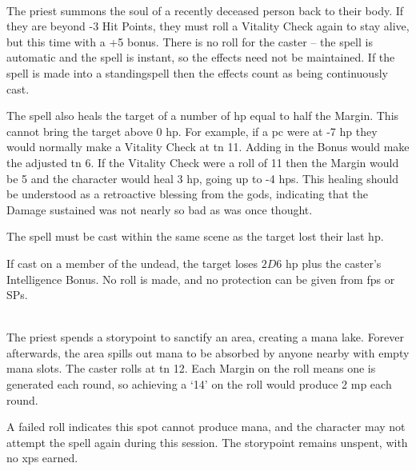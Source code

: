 \begin{multicols}{2}
\\
The priest summons the soul of a recently deceased person back to their body.
If they are beyond -3 Hit Points, they must roll a Vitality Check again to stay alive, but this time with a +5 bonus.
There is no roll for the caster -- the spell is automatic and the spell is instant, so the effects need not be maintained.
If the spell is made into a \gls{standingspell} then the effects count as being continuously cast.

The spell also heals the target of a number of \gls{hp} equal to half the Margin.
This cannot bring the target above 0 \gls{hp}.
For example, if a \gls{pc} were at -7 \gls{hp} they would normally make a Vitality Check at \gls{tn} 11.
Adding in the Bonus would make the adjusted \gls{tn} 6.
If the Vitality Check were a roll of 11 then the Margin would be 5 and the character would heal 3 \gls{hp}, going up to -4 \glspl{hp}.
This healing should be understood as a retroactive blessing from the gods, indicating that the Damage sustained was not nearly so bad as was once thought.

The spell must be cast within the same scene as the target lost their last \gls{hp}.

If cast on a member of the undead, the target loses $2D6$ \gls{hp} plus the caster's Intelligence Bonus.
No roll is made, and no protection can be given from \glspl{fp} or \glspl{SP}.

\\
The priest spends a \gls{storypoint} to sanctify an area, creating a mana lake.
Forever afterwards, the area spills out mana to be absorbed by anyone nearby with empty mana slots.
The caster rolls at \gls{tn} 12.
Each Margin on the roll means one  is generated each round, so achieving a `14' on the roll would produce 2 \gls{mp} each round.

A failed roll indicates this spot cannot produce mana, and the character may not attempt the spell again during this session.
The \gls{storypoint} remains unspent, with no \glspl{xp} earned.

\end{multicols}


